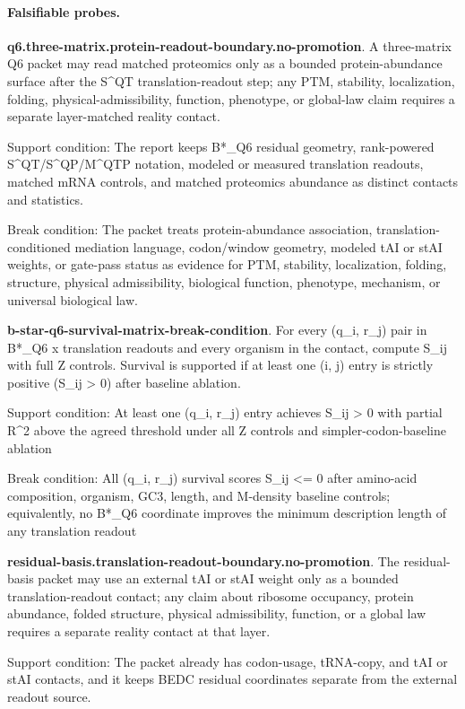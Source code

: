 \paragraph{Falsifiable probes.}
\textbf{q6.three-matrix.protein-readout-boundary.no-promotion}. A three-matrix Q6 packet may read matched proteomics only as a bounded protein-abundance surface after the S\textasciicircum{}QT translation-readout step; any PTM, stability, localization, folding, physical-admissibility, function, phenotype, or global-law claim requires a separate layer-matched reality contact.

Support condition: The report keeps B*\_Q6 residual geometry, rank-powered S\textasciicircum{}QT/S\textasciicircum{}QP/M\textasciicircum{}QTP notation, modeled or measured translation readouts, matched mRNA controls, and matched proteomics abundance as distinct contacts and statistics.

Break condition: The packet treats protein-abundance association, translation-conditioned mediation language, codon/window geometry, modeled tAI or stAI weights, or gate-pass status as evidence for PTM, stability, localization, folding, structure, physical admissibility, biological function, phenotype, mechanism, or universal biological law.

\textbf{b-star-q6-survival-matrix-break-condition}. For every (q\_i, r\_j) pair in B*\_Q6 x translation readouts and every organism in the contact, compute S\_ij with full Z controls. Survival is supported if at least one (i, j) entry is strictly positive (S\_ij > 0) after baseline ablation.

Support condition: At least one (q\_i, r\_j) entry achieves S\_ij > 0 with partial R\textasciicircum{}2 above the agreed threshold under all Z controls and simpler-codon-baseline ablation

Break condition: All (q\_i, r\_j) survival scores S\_ij <= 0 after amino-acid composition, organism, GC3, length, and M-density baseline controls; equivalently, no B*\_Q6 coordinate improves the minimum description length of any translation readout

\textbf{residual-basis.translation-readout-boundary.no-promotion}. The residual-basis packet may use an external tAI or stAI weight only as a bounded translation-readout contact; any claim about ribosome occupancy, protein abundance, folded structure, physical admissibility, function, or a global law requires a separate reality contact at that layer.

Support condition: The packet already has codon-usage, tRNA-copy, and tAI or stAI contacts, and it keeps BEDC residual coordinates separate from the external readout source.

